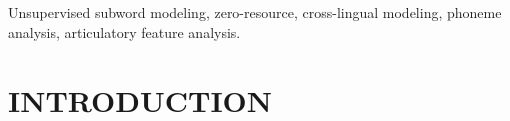 \documentclass[transmag]{IEEEtran}
\begin{document}
{\begin{abstract}
\end{abstract}

\begin{IEEEkeywords}
Unsupervised subword modeling, zero-resource, cross-lingual modeling, phoneme analysis, articulatory feature analysis.

\end{IEEEkeywords}

}

\maketitle

\section{INTRODUCTION}
\end{document}
